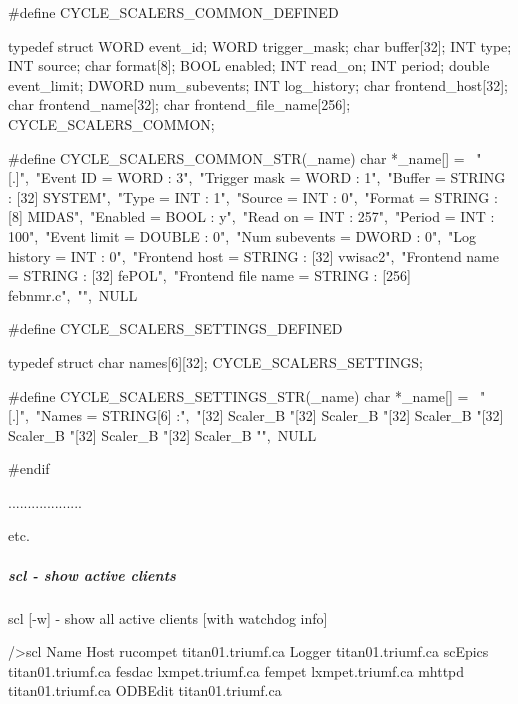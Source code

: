 \begin{DoxyCode}
#define CYCLE_SCALERS_COMMON_DEFINED

typedef struct {
  WORD      event_id;
  WORD      trigger_mask;
  char      buffer[32];
  INT       type;
  INT       source;
  char      format[8];
  BOOL      enabled;
  INT       read_on;
  INT       period;
  double    event_limit;
  DWORD     num_subevents;
  INT       log_history;
  char      frontend_host[32];
  char      frontend_name[32];
  char      frontend_file_name[256];
} CYCLE_SCALERS_COMMON;

#define CYCLE_SCALERS_COMMON_STR(_name) char *_name[] = {\
"[.]",\
"Event ID = WORD : 3",\
"Trigger mask = WORD : 1",\
"Buffer = STRING : [32] SYSTEM",\
"Type = INT : 1",\
"Source = INT : 0",\
"Format = STRING : [8] MIDAS",\
"Enabled = BOOL : y",\
"Read on = INT : 257",\
"Period = INT : 100",\
"Event limit = DOUBLE : 0",\
"Num subevents = DWORD : 0",\
"Log history = INT : 0",\
"Frontend host = STRING : [32] vwisac2",\
"Frontend name = STRING : [32] fePOL",\
"Frontend file name = STRING : [256] febnmr.c",\
"",\
NULL }

#define CYCLE_SCALERS_SETTINGS_DEFINED

typedef struct {
  char      names[6][32];
} CYCLE_SCALERS_SETTINGS;

#define CYCLE_SCALERS_SETTINGS_STR(_name) char *_name[] = {\
"[.]",\
"Names = STRING[6] :",\
"[32] Scaler_B%
"[32] Scaler_B%
"[32] Scaler_B%
"[32] Scaler_B%
"[32] Scaler_B%
"[32] Scaler_B%
"",\
NULL }

#endif

...................

etc.
\end{DoxyCode}


\label{RC_odbedit_examples_idx_clients_active_odbedit}
\hypertarget{RC_odbedit_examples_idx_clients_active_odbedit}{}
 

\hypertarget{RC_odbedit_examples_RC_odbedit_scl}{}\subparagraph{scl -\/ show active clients}\label{RC_odbedit_examples_RC_odbedit_scl}

\begin{DoxyCode}
scl [-w]                - show all active clients [with watchdog info]
\end{DoxyCode}
 \par
 
\begin{DoxyCode}
/>scl
Name                Host
rucompet            titan01.triumf.ca
Logger              titan01.triumf.ca
scEpics             titan01.triumf.ca
fesdac              lxmpet.triumf.ca
fempet              lxmpet.triumf.ca
mhttpd              titan01.triumf.ca
ODBEdit             titan01.triumf.ca
\end{DoxyCode}




